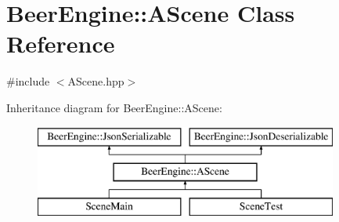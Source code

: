 \hypertarget{class_beer_engine_1_1_a_scene}{}\section{Beer\+Engine\+:\+:A\+Scene Class Reference}
\label{class_beer_engine_1_1_a_scene}


{\ttfamily \#include $<$A\+Scene.\+hpp$>$}

Inheritance diagram for Beer\+Engine\+:\+:A\+Scene\+:\begin{figure}[H]
\begin{center}
\leavevmode
\includegraphics[height=3.000000cm]{class_beer_engine_1_1_a_scene}
\end{center}
\end{figure}
